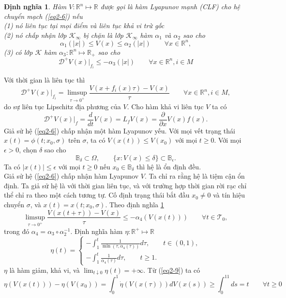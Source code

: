 \documentclass[14pt,a4paper,oneside]{report}		%
\newtheorem{define}[theorem]{Định nghĩa}
\begin{document}
\begin{define} \label{def2-4}
Hàm $V:\mathbb{R}^n\mapsto\mathbb{R}$ được gọi là hàm Lyapunov mạnh (CLF) cho hệ chuyển mạch (\ref{eq2-6}) nếu\\
(1) nó liên tục tại mọi điểm và liên tục khả vi trừ gốc\\
(2) nó chấp nhận lớp $\mathcal{K}_\infty$ bị chặn là lớp $\mathcal{K}_\infty$ hàm $\alpha_1$ và $\alpha_2$ sao cho
$$\alpha_1(|x|)\leq V(x)\leq \alpha_2(|x|)\qquad\forall x\in\mathbb{R}^n,$$
(3) có lớp $\mathcal{K}$ hàm $\alpha_3: \mathbb{R}^n\mapsto\mathbb{R}_+$ sao cho
\begin{equation} \label{eq2-7}
\mathcal{D}^+V(x)|_{f_i}\leq -\alpha_3(|x|)\qquad\forall x\in\mathbb{R}^n, i\in M
\end{equation}
\end{define}
Với thời gian là liên tục thì
\begin{equation} \label{eq2-8}
\mathcal{D}^+V(x)|_{f_i}=\limsup_{\tau\rightarrow 0^+}\frac{V(x+f_i(x)\tau)-V(x)}{\tau}\qquad\forall x\in\mathbb{R}^n,i\in M,
\end{equation}
do sự liên tục Lipschitz địa phương của $V$. Cho hàm khả vi liên tục $V$ ta có
$$\mathcal{D}^+V(x)|_f=\frac{d}{dt}V(x)=L_fV(x)=\frac{\partial}{\partial x}V(x)f(x).$$
Giả sử hệ (\ref{eq2-6}) chấp nhận một hàm Lyapunov yếu. Với mọi vết trạng thái $x(t)=\phi(t;x_0,\sigma)$ trên $\sigma$, ta có $V(x(t))\leq V(x_0)$ với mọi $t\geq 0$. Với mọi $\epsilon >0$, chọn $\delta$ sao cho
$$\mathbb{B}_\delta\subset\Omega , \qquad\{x:V(x)\leq\delta\}\subset\mathbb{B}_\epsilon .$$
Ta có $|x(t)|\leq\epsilon$ với mọi $t\geq 0$ nếu $x_0 \in\mathbb{B}_\delta$ thì hệ là ổn định đều.\\
Giả sử hệ (\ref{eq2-6}) chấp nhận hàm Lyapunov $V$. Ta chỉ ra rằng hệ là tiệm cận ổn định. Ta giả sử hệ là với thời gian liên tục, và với trường hợp thời gian rời rạc chỉ thể chỉ ra theo một cách tương tự. Cố định trạng thái bắt đầu $x_0 \neq 0$ và tín hiệu chuyển $\sigma$, và $x(t)=x(t;x_0,\sigma)$. Theo định nghĩa \ref{def2-4}
\begin{equation} \label{eq2-9}
\limsup_{\tau\rightarrow 0^+}\frac{V(x(t+\tau))-V(x)}{\tau}\leq -\alpha_4(V(x(t)))\qquad\forall t\in\mathcal{T}_0,
\end{equation}
trong đó $\alpha_4 = \alpha_3\circ\alpha_2^{-1}$. Định nghĩa hàm $\eta : \mathbb{R}^+\mapsto\mathbb{R}$
$$
\eta (t) = \left\{
\begin{array}{l}
-\int_1^t\frac{1}{\min(\tau,\alpha_4(\tau))}d\tau ,\qquad t\in (0,1),\\
-\int_1^t\frac{1}{\alpha_4(\tau)}d\tau , \qquad t\geq 1.
\end{array}\right.
$$
$\eta$ là hàm giảm, khả vi, và $\lim_{t\downarrow 0}\eta(t)=+\infty$. Từ (\ref{eq2-9}) ta có
\begin{equation} \label{eq2-10}
\eta (V(x(t))) - \eta (V(x_0)) = \int_0^1\dot{\eta}(V(x(\tau)))dV(x(s)) \geq \int_0^11ds=t\qquad\forall t\geq 0
\end{equation}
\end{document}
